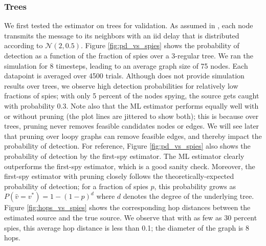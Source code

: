 \subsubsection{Trees}
We first tested the estimator on trees for validation. As assumed in \cite{pinto}, each node transmits the message to its neighbors with an iid delay that is distributed according to $\mathcal N(2,0.5)$. Figure \ref{fig:pd_vs_spies} shows the probability of detection as a function of the fraction of spies over a 3-regular tree. We ran the simulation for 8 timesteps, leading to an average graph size of 75 nodes. Each datapoint is averaged over 4500 trials. Although \cite{pinto} does not provide simulation results over trees, we observe high detection probabilities for relatively low fractions of spies; with only 5 percent of the nodes spying, the source gets caught with probability 0.3. Note also that the ML estimator performs equally well with or without pruning (the plot lines are jittered to show both); this is because over trees, pruning never removes feasible candidates nodes or edges. We will see later that pruning over loopy graphs can remove feasible edges, and thereby impact the probability of detection. 
For reference, Figure \ref{fig:pd_vs_spies} also shows the probability of detection by the first-spy estimator. The ML estimator clearly outperforms the first-spy estimator, which is a good sanity check. Moreover, the first-spy estimator with pruning closely follows the theoretically-expected probability of detection; for a fraction of spies $p$, this probability grows as $P(\hat v=v^*)=1-(1-p)^d$ where $d$ denotes the degree of the underlying tree.
Figure \ref{fig:hops_vs_spies} shows the corresponding hop distances between the estimated source and the true source. We observe that with as few as 30 percent spies, this average hop distance is less than 0.1; the diameter of the graph is 8 hops. 

